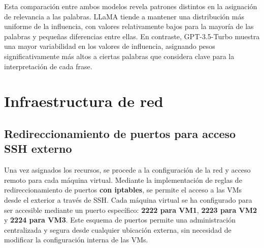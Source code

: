 Esta comparación entre ambos modelos revela patrones distintos en la asignación de relevancia a las palabras. LLaMA tiende a mantener una distribución más uniforme de la influencia, con valores relativamente bajos para la mayoría de las palabras y pequeñas diferencias entre ellas. En contraste, GPT-3.5-Turbo muestra una mayor variabilidad en los valores de influencia, asignando pesos significativamente más altos a ciertas palabras que considera clave para la interpretación de cada frase.


















\section{Infraestructura de red} 
\subsection{Redireccionamiento de puertos para acceso SSH externo}

Una vez asignados los recursos, se procede a la configuración de la red y acceso remoto para cada máquina virtual. Mediante la implementación de reglas de redireccionamiento de puertos \textbf{con iptables}, se permite el acceso a las VMs desde el exterior a través de SSH. Cada máquina virtual se ha configurado para ser accesible mediante un puerto específico: \textbf{2222 para VM1}, \textbf{2223 para VM2} y \textbf{2224 para VM3}. Este esquema de puertos permite una administración centralizada y segura desde cualquier ubicación externa, sin necesidad de modificar la configuración interna de las VMs.

